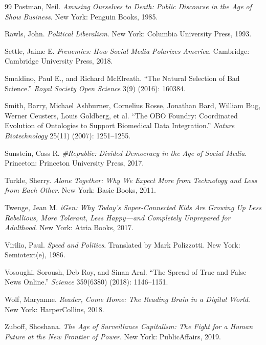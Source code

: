 \documentclass[11pt]{article}
\begin{document}
\begin{thebibliography}{99}
Postman, Neil.
\newblock \emph{Amusing Ourselves to Death: Public Discourse in the Age of Show Business}.
\newblock New York: Penguin Books, 1985.

Rawls, John.
\newblock \emph{Political Liberalism}.
\newblock New York: Columbia University Press, 1993.

Settle, Jaime E.
\newblock \emph{Frenemies: How Social Media Polarizes America}.
\newblock Cambridge: Cambridge University Press, 2018.

Smaldino, Paul E., and Richard McElreath.
\newblock ``The Natural Selection of Bad Science.''
\newblock \emph{Royal Society Open Science} 3(9) (2016): 160384.

Smith, Barry, Michael Ashburner, Cornelius Rosse, Jonathan Bard, William Bug, Werner Ceusters, Louis Goldberg, et al.
\newblock ``The OBO Foundry: Coordinated Evolution of Ontologies to Support Biomedical Data Integration.''
\newblock \emph{Nature Biotechnology} 25(11) (2007): 1251--1255.

Sunstein, Cass R.
\newblock \emph{\#Republic: Divided Democracy in the Age of Social Media}.
\newblock Princeton: Princeton University Press, 2017.

Turkle, Sherry.
\newblock \emph{Alone Together: Why We Expect More from Technology and Less from Each Other}.
\newblock New York: Basic Books, 2011.

Twenge, Jean M.
\newblock \emph{iGen: Why Today's Super-Connected Kids Are Growing Up Less Rebellious, More Tolerant, Less Happy---and Completely Unprepared for Adulthood}.
\newblock New York: Atria Books, 2017.

Virilio, Paul.
\newblock \emph{Speed and Politics}.
\newblock Translated by Mark Polizzotti. New York: Semiotext(e), 1986.

Vosoughi, Soroush, Deb Roy, and Sinan Aral.
\newblock ``The Spread of True and False News Online.''
\newblock \emph{Science} 359(6380) (2018): 1146--1151.

Wolf, Maryanne.
\newblock \emph{Reader, Come Home: The Reading Brain in a Digital World}.
\newblock New York: HarperCollins, 2018.

Zuboff, Shoshana.
\newblock \emph{The Age of Surveillance Capitalism: The Fight for a Human Future at the New Frontier of Power}.
\newblock New York: PublicAffairs, 2019.

\end{thebibliography}
\end{document}
